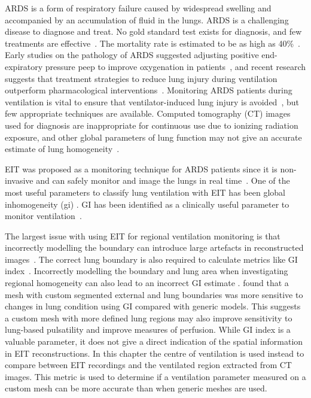 ARDS is a form of
respiratory failure caused by widespread swelling and 
accompanied by an accumulation of fluid in the 
lungs. 
ARDS is a challenging disease to diagnose and treat. 
No gold standard test exists for diagnosis, 
and few treatments are 
effective~\parencite{pham_fifty_2017}. The 
mortality rate is estimated to be as high 
as 40\%~\parencite{abe_epidemiology_2018}.
Early studies on the pathology of ARDS suggested
adjusting positive end-expiratory pressure
\acrshort{peep} to improve oxygenation in 
patients~\parencite{petty_cards_2001,ashbaugh_acute_1967}, 
and recent research suggests that treatment strategies to 
reduce lung injury during ventilation outperform
pharmacological interventions~\parencite{duggal_pharmacological_2015}. 
Monitoring ARDS patients during ventilation is vital to ensure that 
ventilator-induced lung injury is avoided~\parencite{bates_ventilator-induced_2018}, 
but few appropriate techniques are available. Computed tomography (CT) images used for
diagnosis are inappropriate for continuous use due to ionizing radiation 
exposure, and other global parameters of lung function may not give an accurate
estimate of lung homogeneity~\parencite{zhao_evaluation_2009}. 

EIT was proposed
as a monitoring technique for ARDS patients since it is non-invasive 
and can safely monitor and image the lungs in 
real time~\parencite{denai_absolute_2010,frerichs_chest_2017}.
One of the most useful parameters to classify lung ventilation 
with EIT has been global inhomogeneity (\acrshort{gi})
\parencite{sribar_influence_2020,hough_effect_2016,humphreys_effect_2011,
zhao_regional_2012,hochhausen_comparison_2019,hsu_regional_2017}.
GI has been identified as a clinically useful parameter to monitor 
ventilation~\parencite{frerichs_chest_2019}.

The largest issue with using EIT for regional 
ventilation monitoring is that incorrectly modelling the 
boundary can introduce large artefacts in reconstructed
images~\parencite{grychtol_impact_2012}. The correct 
lung boundary is also required to calculate metrics like GI
index~\parencite{zhao_evaluation_2009}.
Incorrectly modelling the boundary and lung area when investigating 
regional homogeneity can also lead to an incorrect GI 
estimate \parencite{yang_lung_2021}. 
 found that 
a mesh with custom segmented external and lung boundaries 
was more sensitive to changes in lung condition using GI 
compared with generic models.
This suggests a custom mesh with more defined lung regions 
may also improve sensitivity to lung-based pulsatility and 
improve measures of perfusion. 
While GI index is a valuable parameter, it does not 
give a direct indication of the spatial information in EIT reconstructions.
In this chapter the centre of ventilation is used instead 
to compare between EIT recordings and the ventilated region extracted
from CT images. This metric is used to determine if 
a ventilation parameter measured on a custom mesh can be more accurate than 
when generic meshes are used.

